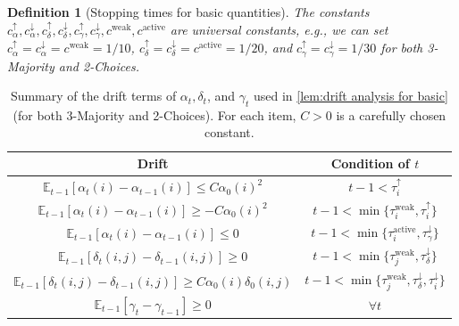 \documentclass[letterpaper,11pt]{article}
\newtheorem{definition}[theorem]{Definition}
\newcommand{\alphanorm}{\gamma}
\newcommand{\cweak}{c^{\mathrm{weak}}}
\newcommand{\calphaup}{c^{\uparrow}_\alpha}
\newcommand{\calphadown}{c^{\downarrow}_\alpha}
\newcommand{\taunormdown}{\tau^{\downarrow}_\alphanorm}
\newcommand{\cnormup}{c^{\uparrow}_\alphanorm}
\newcommand{\cnormdown}{c^{\downarrow}_\alphanorm}
\newcommand{\cdeltaup}{c^{\uparrow}_\delta}
\newcommand{\taudeltadown}{\tau^{\downarrow}_\delta}
\newcommand{\cdeltadown}{c^{\downarrow}_\delta}
\newcommand{\tauiup}{\tau^{\uparrow}_i}
\newcommand{\ciup}{c_\alpha^{\uparrow}}
\newcommand{\tauidown}{\tau^{\downarrow}_i}
\newcommand{\cidown}{c_\alpha^{\downarrow}}
\newcommand{\tauiweak}{\tau^{\mathrm{weak}}_i}
\newcommand{\taujweak}{\tau^{\mathrm{weak}}_j}
\newcommand{\cactive}{c^{\mathrm{active}}}
\newcommand{\tauiactive}{\tau^{\mathrm{active}}_i}
\begin{document}
\begin{definition}[Stopping times for basic quantities]
  The constants $\ciup,\cidown,\cdeltaup,\cdeltadown,\cnormup,\cnormdown,\cweak,\cactive$ are universal constants, e.g., 
  we can set $\calphaup=\calphadown=\cweak=1/10$, $\cdeltaup=\cdeltadown=\cactive=1/20$, and $\cnormup=\cnormdown=1/30$ for both 3-Majority and 2-Choices.
\end{definition}

\begin{table}[t]
  \centering
  \begin{tabular}{|c|c|}
  \hline
  Drift & Condition of $t$  \\ \hline \hline
  $\mathbb{E}_{t-1}[\alpha_t(i)-\alpha_{t-1}(i)]\leq C\alpha_0(i)^2$ & $t-1<\tauiup$  \\ \hline 
  $\mathbb{E}_{t-1}[\alpha_t(i)-\alpha_{t-1}(i)]\geq - C\alpha_0(i)^2$ & $t-1<\min\{\tauiweak,\tauiup\}$   \\ \hline
  $\mathbb{E}_{t-1}[\alpha_t(i)-\alpha_{t-1}(i)]\leq 0$ &$t-1<\min\{\tauiactive,\taunormdown\}$   \\ \hline \hline
  $\mathbb{E}_{t-1}[\delta_t(i,j)-\delta_{t-1}(i,j)]\geq 0$ & $t-1<\min\{\taujweak,\taudeltadown\}$   \\ \hline
  $\mathbb{E}_{t-1}[\delta_t(i,j)-\delta_{t-1}(i,j)]\geq C\alpha_{0}(i)\delta_{0}(i,j)$ & $t-1<\min\{\taujweak,\taudeltadown,\tauidown\}$   \\ \hline \hline
  $\mathbb{E}_{t-1}[\alphanorm_t-\alphanorm_{t-1}]\geq 0$ & $\forall t$  \\ \hline 
  \end{tabular}
  \caption{Summary of the drift terms of $\alpha_t, \delta_t$, and $\alphanorm_t$ used in \cref{lem:drift analysis for basic} (for both 3-Majority and 2-Choices).
  For each item, $C>0$ is a carefully chosen constant.}
  \label{table:drift}
  \end{table}
\end{document}
